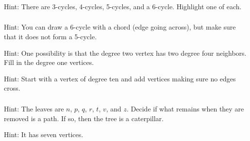 \subsubsection*{ \answers}
    Hint: There are 3-cycles, 4-cycles, 5-cycles, and a 6-cycle.  Highlight one of each.

\subsubsection*{ \answers}
\begin{apart}
    \item Hint: You can draw a 6-cycle with a chord (edge going across), but make sure that it does not form a 5-cycle.
    \item Hint: One possibility is that the degree two vertex has two degree four neighbors. Fill in the degree one vertices.
    \item Hint: Start with a vertex of degree ten and add vertices making sure no edges cross.
\end{apart}

\subsubsection*{ \answers}
\begin{apart}
    \item Hint: The leaves are $n$, $p$, $q$, $r$, $t$, $v$, and $z$.  Decide if what remains when they are removed is a path.  If so, then the tree is a caterpillar.
    \item Hint: It has seven vertices.
\end{apart}






